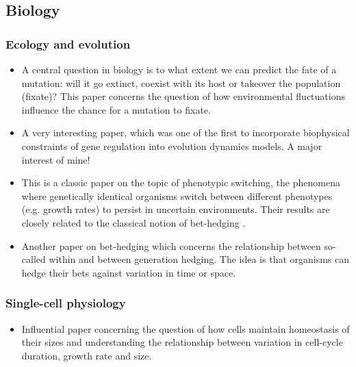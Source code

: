 \documentclass{amsart}
\begin{document}
\subsection{Biology}

\subsubsection{Ecology and evolution}

\begin{itemize}
\item \cite{cvijovi2015} A central question in biology is to what extent we can predict the fate of a mutation: will it go extinct, coexist with its host or takeover the population (fixate)? This paper concerns the question of how environmental fluctuations influence the chance for a mutation to fixate.
\item \cite{lassig2007}  A very interesting paper, which was one of the first to incorporate biophysical constraints of gene regulation into evolution dynamics models. A major interest of mine! 
\item \cite{kussell2005b} This is a classic paper on the topic of phenotypic switching, the phenomena where genetically identical organisms switch between different phenotypes (e.g. growth rates) to persist in uncertain environments. Their results are closely related to the classical notion of bet-hedging \cite{kelly1956}. 
\item \cite{schreiber2015} Another paper on bet-hedging which concerns the relationship between so-called within and between generation hedging. The idea is that organisms can hedge their bets against variation in time or space. 
\end{itemize}

\subsubsection{Single-cell physiology}
\begin{itemize}
\item \cite{amir2014} Influential paper concerning the question of how cells maintain homeostasis of their sizes and understanding the relationship between variation in cell-cycle duration, growth rate and size. 
\end{itemize}

%
\end{document}
